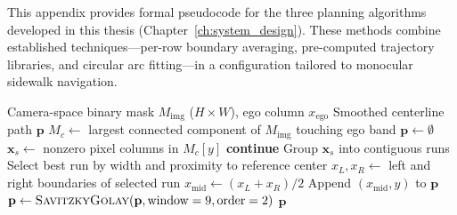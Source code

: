 \documentclass[12pt,letterpaper,oneside]{report}
\begin{document}
This appendix provides formal pseudocode for the three planning algorithms developed in this thesis (Chapter~\ref{ch:system_design}).  These methods combine established techniques---per-row boundary averaging, pre-computed trajectory libraries, and circular arc fitting---in a configuration tailored to monocular sidewalk navigation.

\begin{algorithm}[H]
\caption{Image-Space Midpoint Planner}
\label{alg:midpoint}
\begin{algorithmic}[1]
\Require Camera-space binary mask $M_{\text{img}}$ ($H \times W$), ego column $x_{\text{ego}}$
\Ensure Smoothed centerline path $\mathbf{p}$
\State $M_c \gets$ largest connected component of $M_{\text{img}}$ touching ego band
\State $\mathbf{p} \gets \emptyset$
    \State $\mathbf{x}_s \gets$ nonzero pixel columns in $M_c[y]$
     \textbf{continue} \EndIf
    \State Group $\mathbf{x}_s$ into contiguous runs
    \State Select best run by width and proximity to reference center
    \State $x_L, x_R \gets$ left and right boundaries of selected run
    \State $x_{\text{mid}} \gets (x_L + x_R) / 2$
    \State Append $(x_{\text{mid}}, y)$ to $\mathbf{p}$
\EndFor
\State $\mathbf{p} \gets \Call{SavitzkyGolay}{\mathbf{p}, \text{window}=9, \text{order}=2}$
\State \Return $\mathbf{p}$
\end{algorithmic}
\end{algorithm}
\end{document}
